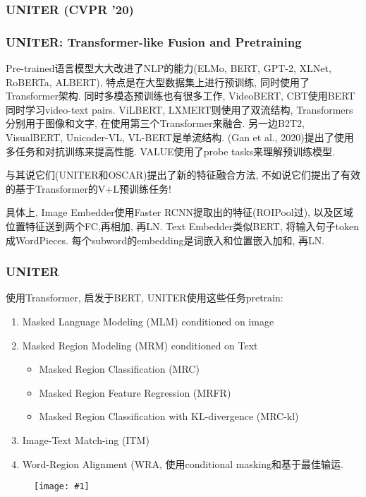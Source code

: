 \documentclass{beamer}
\newcommand{\cfig}[2]{
    \begin{figure}[htbp]
    \centering
    \texttt{[image: \#1]}
\end{figure}
}
\newenvironment{remark}[1][Remark]{\begin{trivlist}
    \item[\hskip \labelsep {\bfseries #1}]}{\end{trivlist}}
\begin{document}
\subsubsection{UNITER (CVPR '20)}

\begin{frame}
    \frametitle{UNITER: Transformer-like Fusion and Pretraining}

    Pre-trained语言模型大大改进了NLP的能力(ELMo, BERT, GPT-2, XLNet, RoBERTa, ALBERT), 特点是在大型数据集上进行预训练, 同时使用了Transformer架构. 同时多模态预训练也有很多工作, VideoBERT, CBT使用BERT同时学习video-text pairs. ViLBERT, LXMERT则使用了双流结构, Transformers分别用于图像和文字, 在使用第三个Transformer来融合. 另一边B2T2, VisualBERT, Unicoder-VL, VL-BERT是单流结构. (Gan et al., 2020)提出了使用多任务和对抗训练来提高性能. VALUE使用了probe tasks来理解预训练模型.
    \begin{remark}
        与其说它们(UNITER和OSCAR)提出了新的特征融合方法, 不如说它们提出了有效的基于Transformer的V+L预训练任务! 
    \end{remark}
    
    具体上, Image Embedder使用Faster RCNN提取出的特征(ROIPool过), 以及区域位置特征送到两个FC,再相加, 再LN. Text Embedder类似BERT, 将输入句子token成WordPieces. 每个subword的embedding是词嵌入和位置嵌入加和, 再LN. 

\end{frame}

\begin{frame}
    \frametitle{UNITER}

    使用Transformer, 启发于BERT, UNITER使用这些任务pretrain:
    \begin{enumerate}
        \item Masked Language Modeling (MLM) conditioned on image
        \item Masked Region Modeling (MRM) conditioned on Text
        \begin{itemize}
            \item Masked Region Classification (MRC)
            \item Masked Region Feature Regression (MRFR)
            \item Masked Region Classification with KL-divergence (MRC-kl)
        \end{itemize}
        \item Image-Text Match-ing  (ITM)
        \item Word-Region  Alignment  (WRA, 使用conditional masking和基于最佳输运.
    \end{enumerate}

    \cfig{uniter-arch.png}{0.8}

\end{frame}
\end{document}
